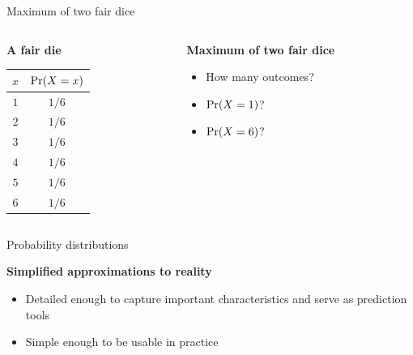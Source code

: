 \begin{frame}{Maximum of two fair dice}
    \begin{columns}[t]
        \begin{column}{0.5\textwidth}
            \centering
            \textbf{A fair die} \\[\bigskipamount]
            \begin{tabular}{cc}
                \toprule
                $x$ & $\Pr\!\left( X = x \right)$ \\
                \midrule
                $1$ & $1/6$ \\
                $2$ & $1/6$ \\
                $3$ & $1/6$ \\
                $4$ & $1/6$ \\
                $5$ & $1/6$ \\
                $6$ & $1/6$ \\
                \bottomrule
            \end{tabular}
        \end{column}
        \begin{column}{0.5\textwidth}
            \centering
            \textbf{Maximum of two fair dice} \\[\bigskipamount]
            \begin{itemize}
                \item How many outcomes?
                \item $\Pr\!\left( X = 1 \right)$?
                \item $\Pr\!\left( X = 6 \right)$?
            \end{itemize}
        \end{column}
    \end{columns}
\end{frame}

\begin{frame}{Probability distributions}
    \begin{center}
        \large%
        \textbf{Simplified approximations to reality}
    \end{center}
    \vfill
    \begin{itemize}
        \item Detailed enough to capture important characteristics and serve as
              \alert{prediction tools}
        \item Simple enough to be usable in practice
    \end{itemize}
\end{frame}

